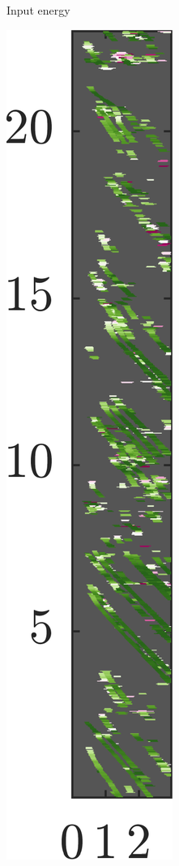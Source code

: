 \begin{figure}[htbp]
\begin{subfigure}[t]{0.32\linewidth}
        \caption{\small Input energy}
    \end{subfigure}%
    \hfill%
    \begin{subfigure}[t]{0.32\linewidth}  
        \centering 
        \includegraphics[width=\linewidth]{gfx/results/sauna_doppler.png}

\end{subfigure}
\end{figure}
